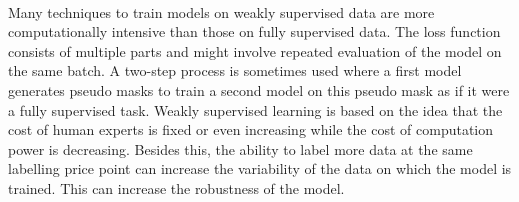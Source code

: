 \\[5pt]
\par{
    Many techniques to train models on weakly supervised data are more computationally intensive than those on fully supervised data.
    The loss function consists of multiple parts and might involve repeated evaluation of the model on the same batch. 
    A two-step process is sometimes used where a first model generates pseudo masks to train a second model on this pseudo mask as if it were a fully supervised task.
    Weakly supervised learning is based on the idea that the cost of human experts is fixed or even increasing while the cost of computation power is decreasing.
    Besides this, the ability to label more data at the same labelling price point can increase the variability of the data on which the model is trained. 
    This can increase the robustness of the model.
}